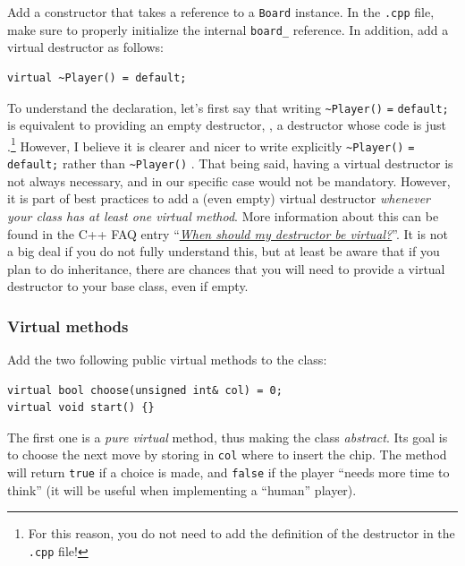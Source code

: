 \documentclass{article}
\begin{document}
Add a constructor that takes a reference to a \texttt{Board} instance. In the \texttt{.cpp} file, make sure to properly initialize the internal \texttt{board\string_} reference. In addition, add a virtual destructor as follows:
\begin{center}
\begin{minipage}{.9\textwidth}
\begin{lstlisting}[style=mycpp,numbers=none]
virtual ~Player() = default;
\end{lstlisting}
\end{minipage}
\end{center}
To understand the declaration, let's first say that writing \texttt{\textasciitilde Player()} \texttt{=} \texttt{default;} is equivalent to providing an empty destructor, \ie, a destructor whose code is just \texttt{\string{\string}}.\footnote{For this reason, you do not need to add the definition of the destructor in the \texttt{.cpp} file!} However, I believe it is clearer and nicer to write explicitly \texttt{\textasciitilde Player()} \texttt{=} \texttt{default;} rather than \texttt{\textasciitilde Player()} \texttt{\string{\string}}. That being said, having a virtual destructor is not always necessary, and in our specific case would not be mandatory. However, it is part of best practices to add a (even empty) virtual destructor \emph{whenever your class has at least one virtual method}. More information about this can be found in the C++ FAQ entry ``\href{https://isocpp.org/wiki/faq/virtual-functions#virtual-dtors}{\emph{When should my destructor be virtual?}}''. It is not a big deal if you do not fully understand this, but at least be aware that if you plan to do inheritance, there are chances that you will need to provide a virtual destructor to your base class, even if empty.


\subsubsection{Virtual methods}

Add the two following public virtual methods to the class:
\begin{center}
\begin{minipage}{.9\textwidth}
\begin{lstlisting}[style=mycpp,numbers=none]
virtual bool choose(unsigned int& col) = 0;
virtual void start() {}
\end{lstlisting}
\end{minipage}
\end{center}
The first one is a \emph{pure virtual} method, thus making the class \emph{abstract}. Its goal is to choose the next move by storing in \texttt{col} where to insert the chip. The method will return \texttt{true} if a choice is made, and \texttt{false} if the player ``needs more time to think'' (it will be useful when implementing a ``human'' player).
\end{document}

